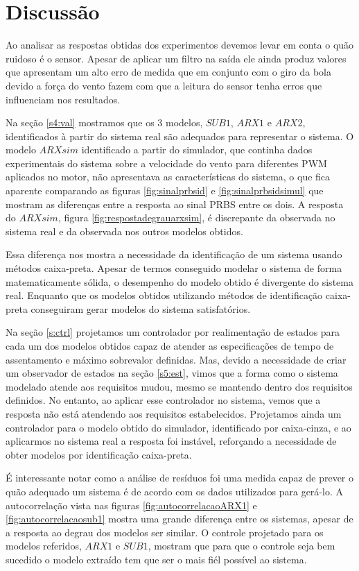 \section{Discussão}

Ao analisar as respostas obtidas dos experimentos devemos levar em conta o quão ruidoso é o sensor. Apesar de aplicar um filtro na saída ele ainda produz valores que apresentam um alto erro de medida que em conjunto com o giro da bola devido a força do vento fazem com que a leitura do sensor tenha erros que influenciam nos resultados.


Na seção \ref{s4:val} mostramos que os 3 modelos, $SUB1$, $ARX1$ e $ARX2$, identificados à partir do sistema real são adequados para representar o sistema. O modelo $ARXsim$ identificado a partir do simulador, que continha dados experimentais do sistema sobre a velocidade do vento para diferentes PWM aplicados no motor, não apresentava as características do sistema, o que fica aparente comparando as figuras \ref{fig:sinalprbsid} e \ref{fig:sinalprbsidsimul} que mostram as diferenças entre a resposta ao sinal PRBS entre os dois. A resposta do $ARXsim$, figura \ref{fig:respostadegrauarxsim}, é discrepante da observada no sistema real e da observada nos outros modelos obtidos.


Essa diferença nos mostra a necessidade da identificação de um sistema usando métodos caixa-preta. Apesar de termos conseguido modelar o sistema de forma matematicamente sólida, o desempenho do modelo obtido é divergente do sistema real. Enquanto que os modelos obtidos utilizando métodos de identificação caixa-preta conseguiram gerar modelos do sistema satisfatórios. 


Na seção \ref{s:ctrl} projetamos um controlador por realimentação de estados para cada um dos modelos obtidos capaz de atender as especificações de tempo de assentamento e máximo sobrevalor definidas. Mas, devido a necessidade de criar um observador de estados na seção \ref{s5:est}, vimos que a forma como o sistema modelado atende aos requisitos mudou, mesmo se mantendo dentro dos requisitos definidos. No entanto, ao aplicar esse controlador no sistema, vemos que a resposta não está atendendo aos requisitos estabelecidos. Projetamos ainda um controlador para o modelo obtido do simulador, identificado por caixa-cinza, e ao aplicarmos no sistema real a resposta foi instável, reforçando a necessidade de obter modelos por identificação caixa-preta.


É interessante notar como a análise de resíduos foi uma medida capaz de prever o quão adequado um sistema é de acordo com os dados utilizados para gerá-lo. A autocorrelação vista nas figuras \ref{fig:autocorrelacaoARX1} e \ref{fig:autocorrelacaosub1} mostra uma grande diferença entre os sistemas, apesar de a resposta ao degrau dos modelos ser similar. O controle projetado para os modelos referidos, $ARX1$ e $SUB1$, mostram que para que o controle seja bem sucedido o modelo extraído tem que ser o mais fiél possível ao sistema.








